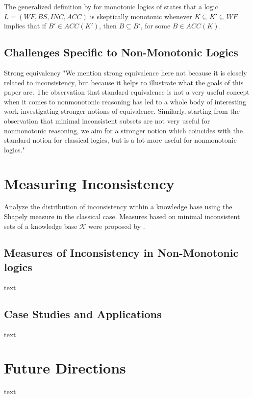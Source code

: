 The generalized definition by \cite{brewka_strong_2019} for monotonic logics of \cite{brewka_equilibria_2007} states that a logic \(L = (WF, BS, INC, ACC)\) is skeptically monotonic whenever \(K \subseteq K' \subseteq WF\) implies that if \(B' \in ACC(K')\), then \(B \subseteq B'\), for some \(B \in ACC(K)\).

\subsection{Challenges Specific to Non-Monotonic Logics}
Strong equivalency \cite{lifschitz_strongly_2001}
"We mention strong equivalence here not because it is closely related to inconsistency, but because it helps to illustrate what the goals of this paper are. The observation that standard equivalence is not a very useful concept when it comes to nonmonotonic reasoning has led to a whole body of interesting work investigating stronger notions of equivalence. Similarly, starting from the observation that minimal inconsistent subsets are not very useful for nonmonotonic reasoning, we aim for a stronger notion which coincides with the standard notion for classical logics, but is a lot more useful for nonmonotonic logics." \cite{brewka_strong_2019}

\section{Measuring Inconsistency}
Analyze the distribution of inconsistency within a knowledge base using the Shapely measure \cite{hunter_measure_2010} in the classical case.
Measures based on minimal inconsistent sets of a knowledge base \(\mathcal{K}\) \cite{jabbour_mis_2016} were proposed by \cite{ulbricht_measuring_2018}.

\subsection{Measures of Inconsistency in Non-Monotonic logics}
text

\subsection{Case Studies and Applications}
text

\section{Future Directions}
text
